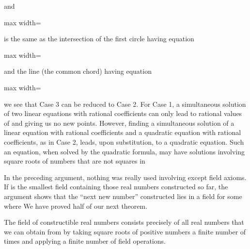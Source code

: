 \documentclass[11pt,oneside]{article}
\begin{document}
\begin{BookBody}
\noindent and

\begin{center}\begin{adjustbox}{max width=\linewidth}\end{adjustbox}\end{center}

\noindent is the same as the intersection of the first circle having equation

\begin{center}\begin{adjustbox}{max width=\linewidth}\end{adjustbox}\end{center}

\noindent and the line (the common chord) having equation

\begin{center}\begin{adjustbox}{max width=\linewidth}\end{adjustbox}\end{center}

\noindent we see that Case 3 can be reduced to Case 2. For Case 1, a simultaneous solution of two linear equations with rational coefficients can only lead to rational values of  and  giving us no new points. However, finding a simultaneous solution of a linear equation with rational coefficients and a quadratic equation with rational coefficients, as in Case 2, leads, upon substitution, to a quadratic equation. Such an equation, when solved by the quadratic formula, may have solutions involving square roots of numbers that are not squares in 

In the preceding argument, nothing was really used involving  except field axioms. If  is the smallest field containing those real numbers constructed so far, the argument shows that the “next new number” constructed lies in a field  for some  where  We have proved half of our next theorem.

 The field  of constructible real numbers consists precisely of all real numbers that we can obtain from  by taking square roots of positive numbers a finite number of times and applying a finite number of field operations.


\end{BookBody}
\end{document}
